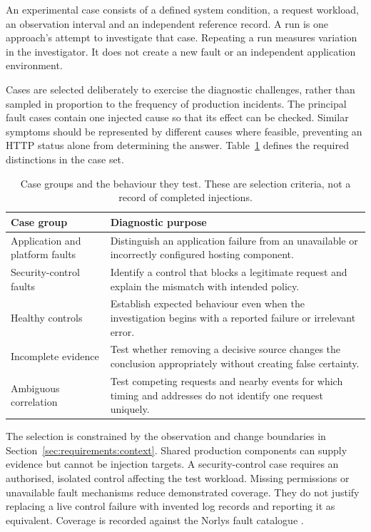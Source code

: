An experimental case consists of a defined system condition, a request
workload, an observation interval and an independent reference record.
A run is one approach's attempt to investigate that case. Repeating a
run measures variation in the investigator. It does not create a new
fault or an independent application environment.

Cases are selected deliberately to exercise the diagnostic challenges,
rather than sampled in proportion to the frequency of production
incidents. The principal fault cases contain one injected cause so that
its effect can be checked. Similar symptoms should be represented by
different causes where feasible, preventing an HTTP status alone from
determining the answer. Table~\ref{tab:methodology:cases} defines the
required distinctions in the case set.

\begin{table}[htbp]
\centering\small
\caption{Case groups and the behaviour they test. These are selection
criteria, not a record of completed injections.}
\label{tab:methodology:cases}
\begin{tabularx}{\textwidth}{@{}>{\raggedright\arraybackslash}p{}>{\raggedright\arraybackslash}X@{}}
\toprule
Case group & Diagnostic purpose \\
\midrule
Application and platform faults & Distinguish an application failure from an unavailable or incorrectly configured hosting component. \\
\addlinespace
Security-control faults & Identify a control that blocks a legitimate request and explain the mismatch with intended policy. \\
\addlinespace
Healthy controls & Establish expected behaviour even when the investigation begins with a reported failure or irrelevant error. \\
\addlinespace
Incomplete evidence & Test whether removing a decisive source changes the conclusion appropriately without creating false certainty. \\
\addlinespace
Ambiguous correlation & Test competing requests and nearby events for which timing and addresses do not identify one request uniquely. \\
\bottomrule
\end{tabularx}
\end{table}

The selection is constrained by the observation and change boundaries in
Section~\ref{sec:requirements:context}. Shared production components can
supply evidence but cannot be injection targets. A security-control case
requires an authorised, isolated control affecting the test workload.
Missing permissions or unavailable fault mechanisms reduce demonstrated
coverage. They do not justify replacing a live control failure with
invented log records and reporting it as equivalent. Coverage is recorded
against the Norlys fault catalogue \parencite[AC-7]{norlys_operations_agents}.

